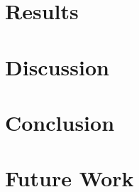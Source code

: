 \documentclass[conference,compsoc]{IEEEtran}
\begin{document}
\section{Results}


\section{Discussion}


\section{Conclusion}


\section{Future Work}





\end{document}
